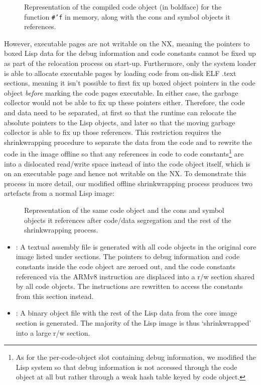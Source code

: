 \documentclass[format=sigconf]{acmart}
\begin{document}
\begin{figure}[h]
  \centering
  
  \caption{Representation of the compiled code object (in boldface)
    for the function \protect\texttt{\#'f} in memory, along with the
    cons and symbol objects it references.}
  \label{fig:before-shrinkwrap}
\end{figure}

However, executable pages are not writable on the NX, meaning the pointers to boxed Lisp data for the debug information and code constants cannot be fixed up as part of the relocation process on start-up. Furthermore, only the system loader is able to allocate executable pages by loading code from on-disk ELF .text sections, meaning it isn't possible to first fix up boxed object pointers in the code object \emph{before} marking the code pages executable. In either case, the garbage collector would not be able to fix up these pointers either. Therefore, the code and data need to be separated, at first so that the runtime can relocate the absolute pointers to the Lisp objects, and later so that the moving garbage collector is able to fix up those references. This restriction requires the shrinkwrapping procedure to separate the data from the code and to rewrite the code in the image offline so that any references in code to code constants\footnote{As for the per-code-object slot containing debug information, we modified the Lisp system so that debug information is not accessed through the code object at all but rather through a weak hash table keyed by code object.} are into a dislocated read/write space instead of into the code object itself, which is on an executable page and hence not writable on the NX. To demonstrate this process in more detail, our modified offline shrinkwrapping process produces two artefacts from a normal Lisp image:

\begin{figure}[h]
  \centering
  
  \caption{Representation of the same code object and the cons and
    symbol objects it references after code/data segregation and the
    rest of the shrinkwrapping process.}
  \label{fig:after-shrinkwrap}
\end{figure}

\begin{itemize}
\item {}: A textual assembly file is generated with all code objects in the original core image listed under  sections. The pointers to debug information and code constants inside the code object are zeroed out, and the code constants referenced via the ARMv8  instruction are displaced into a r/w  section shared by all code objects. The  instructions are rewritten to access the constants from this section instead.
\item {}: A binary object file with the rest of the Lisp data from the core image section is generated. The majority of the Lisp image is thus `shrinkwrapped' into a large r/w  section.
\end{itemize}
\end{document}

